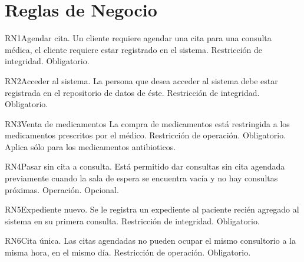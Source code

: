 \section{Reglas de Negocio}

\begin{BussinesRule}{RN1}{Agendar cita.} 
	\BRitem[Descripción:] Un cliente requiere agendar una cita para una consulta médica, el cliente requiere estar registrado en el sistema.
	\BRitem[Tipo:] Restricción de integridad.
	\BRitem[Nivel:] Obligatorio.
\end{BussinesRule}

\begin{BussinesRule}{RN2}{Acceder al sistema.}
	\BRitem[Descripción:] La persona que desea acceder al sistema debe estar registrada en el repositorio de datos de éste.
	\BRitem[Tipo:] Restricción de integridad.
	\BRitem[Nivel:] Obligatorio.
\end{BussinesRule}

\begin{BussinesRule}{RN3}{Venta de medicamentos}
	\BRitem[Descripción:] La compra de medicamentos está restringida a los medicamentos prescritos por el médico.
	\BRitem[Tipo:] Restricción de operación.
	\BRitem[Nivel:] Obligatorio.
    \BRitem[Observación:]  Aplica sólo para los medicamentos antibioticos. 

\end{BussinesRule}

\begin{BussinesRule}{RN4}{Pasar sin cita a consulta.}
	\BRitem[Descripción:] Está permitido dar consultas sin cita agendada previamente cuando la sala de espera se encuentra vacía y no hay consultas próximas. 
	\BRitem[Tipo:] Operación.
	\BRitem[Nivel:] Opcional.
\end{BussinesRule}

\begin{BussinesRule}{RN5}{Expediente nuevo.}
	\BRitem[Descripción:] Se le registra un expediente al paciente recién agregado al sistema en su primera consulta. 
	\BRitem[Tipo:] Restricción de integridad.
	\BRitem[Nivel:] Obligatorio.
\end{BussinesRule}

\begin{BussinesRule}{RN6}{Cita única.}
	\BRitem[Descripción:] Las citas agendadas no pueden ocupar el mismo consultorio a la misma hora, en el mismo día. 
	\BRitem[Tipo:] Restricción de operación.
	\BRitem[Nivel:] Obligatorio.
\end{BussinesRule}

